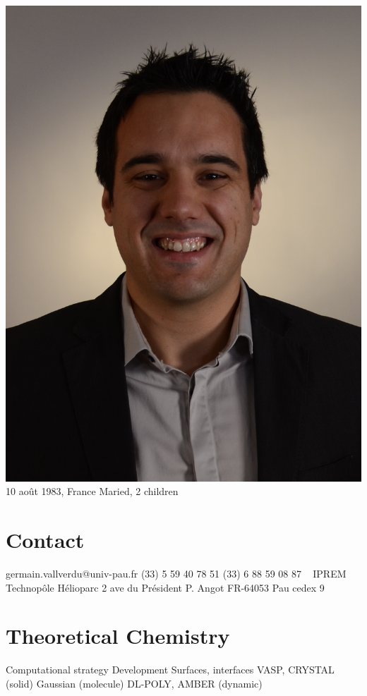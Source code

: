 \documentclass{cv-style}     %
\begin{document}


\begin{aside}
    \includegraphics[width=.8\columnwidth]{img/gvallver}
    10 août 1983, France
    Maried, 2 children
    \section{Contact}
    germain.vallverdu@univ-pau.fr
    (33) 5 59 40 78 51
    (33) 6 88 59 08 87
    ~
    IPREM
    Technopôle Hélioparc
    2 ave du Président P. Angot
    FR-64053 Pau cedex 9
    \section{Theoretical Chemistry}
    Computational strategy
    Development
    Surfaces, interfaces
    VASP, CRYSTAL (solid)
    Gaussian (molecule)
    DL-POLY, AMBER (dynamic)

\end{aside}
\end{document}
